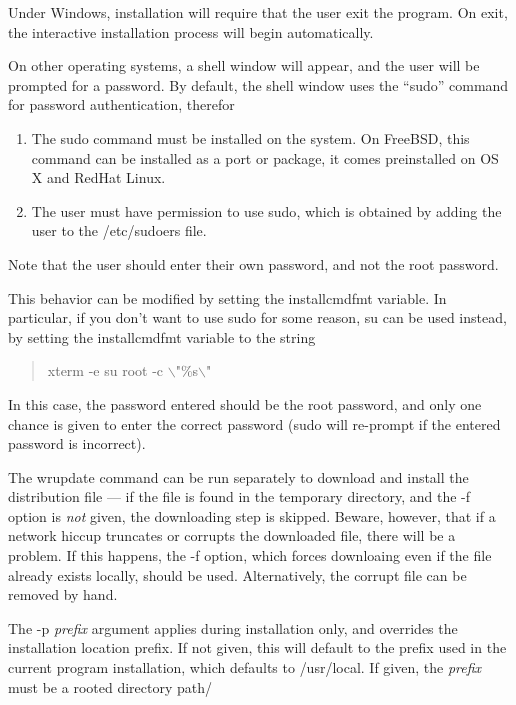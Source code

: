 Under Windows, installation will require that the user exit the
program.  On exit, the interactive installation process will begin
automatically.

On other operating systems, a shell window will appear, and the user
will be prompted for a password.  By default, the shell window uses
the ``{\vt sudo}'' command for password authentication, therefor
\begin{enumerate}
\item{The {\vt sudo} command must be installed on the system.  On
FreeBSD, this command can be installed as a port or package, it
comes preinstalled on OS X and RedHat Linux.}

\item{The user must have permission to use {\vt sudo}, which is
obtained by adding the user to the {\vt /etc/sudoers} file.}
\end{enumerate}

Note that the user should enter their own password, and not the root
password.

This behavior can be modified by setting the {\et installcmdfmt}
variable.  In particular, if you don't want to use {\vt sudo} for some
reason, {\vt su} can be used instead, by setting the {\et
installcmdfmt} variable to the string
\begin{quote}
\vt xterm -e su root -c $\backslash$"\%s$\backslash$"
\end{quote}
In this case, the password entered should be the root password, and
only one chance is given to enter the correct password ({\vt sudo}
will re-prompt if the entered password is incorrect).

The {\cb wrupdate} command can be run separately to download and
install the distribution file --- if the file is found in the
temporary directory, and the {\vt -f} option is {\it not} given, the
downloading step is skipped.  Beware, however, that if a network
hiccup truncates or corrupts the downloaded file, there will be a
problem.  If this happens, the {\vt -f} option, which forces
downloaing even if the file already exists locally, should be used. 
Alternatively, the corrupt file can be removed by hand.

The {\vt -p} {\it prefix} argument applies during installation only,
and overrides the installation location prefix.  If not given, this
will default to the prefix used in the current program installation,
which defaults to {\vt /usr/local}.  If given, the {\it prefix} must
be a rooted directory path/

